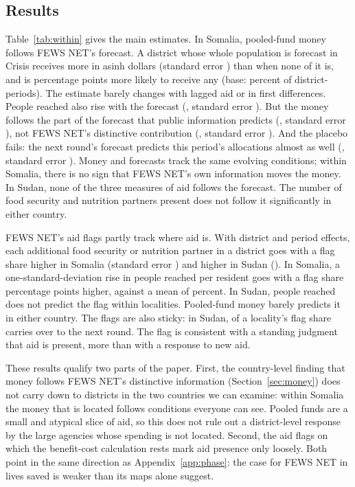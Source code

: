 \documentclass[11pt]{article}
\begin{document}
\begin{appendices}
\subsection*{Results}

Table~\ref{tab:within} gives the main estimates. In Somalia, pooled-fund money follows FEWS NET's forecast. A district whose whole population is forecast in Crisis receives \subSoFc{} more in asinh dollars (standard error \subSoFcSe{}) than when none of it is, and is \subSoAnyPct{} percentage points more likely to receive any (base: \subSoAidShare{} percent of district-periods). The estimate barely changes with lagged aid or in first differences. People reached also rise with the forecast (\subSoReach{}, standard error \subSoReachSe{}). But the money follows the part of the forecast that public information predicts (\subSoBase{}, standard error \subSoBaseSe{}), not FEWS NET's distinctive contribution (\subSoContrib{}, standard error \subSoContribSe{}). And the placebo fails: the next round's forecast predicts this period's allocations almost as well (\subSoPlac{}, standard error \subSoPlacSe{}). Money and forecasts track the same evolving conditions; within Somalia, there is no sign that FEWS NET's own information moves the money. In Sudan, none of the three measures of aid follows the forecast. The number of food security and nutrition partners present does not follow it significantly in either country.

FEWS NET's aid flags partly track where aid is. With district and period effects, each additional food security or nutrition partner in a district goes with a flag share \subSoFlagPres{} higher in Somalia (standard error \subSoFlagPresSe{}) and \subSdFlagPres{} higher in Sudan (\subSdFlagPresSe{}). In Somalia, a one-standard-deviation rise in people reached per resident goes with a flag share \subSoFlagReachSd{} percentage points higher, against a mean of \subSoFlagMean{} percent. In Sudan, people reached does not predict the flag within localities. Pooled-fund money barely predicts it in either country. The flags are also sticky: in Sudan, \subSdFlagPersist{} of a locality's flag share carries over to the next round. The flag is consistent with a standing judgment that aid is present, more than with a response to new aid.

These results qualify two parts of the paper. First, the country-level finding that money follows FEWS NET's distinctive information (Section~\ref{sec:money}) does not carry down to districts in the two countries we can examine: within Somalia the money that is located follows conditions everyone can see. Pooled funds are a small and atypical slice of aid, so this does not rule out a district-level response by the large agencies whose spending is not located. Second, the aid flags on which the benefit-cost calculation rests mark aid presence only loosely. Both point in the same direction as Appendix~\ref{app:phase}: the case for FEWS NET in lives saved is weaker than its maps alone suggest.


\end{appendices}
\end{document}
